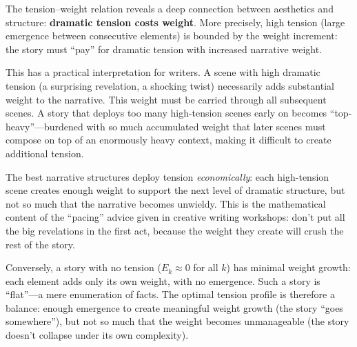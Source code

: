 \begin{remark}
\label{rem:tension-weight-intuition}
The tension--weight relation reveals a deep connection between aesthetics
and structure: \textbf{dramatic tension costs weight}.  More precisely,
high tension (large emergence between consecutive elements) is bounded by
the weight increment: the story must ``pay'' for dramatic tension with
increased narrative weight.

This has a practical interpretation for writers.  A scene with high dramatic
tension (a surprising revelation, a shocking twist) necessarily adds
substantial weight to the narrative.  This weight must be carried through
all subsequent scenes.  A story that deploys too many high-tension scenes
early on becomes ``top-heavy''---burdened with so much accumulated weight
that later scenes must compose on top of an enormously heavy context,
making it difficult to create additional tension.

The best narrative structures deploy tension \emph{economically}: each
high-tension scene creates enough weight to support the next level of
dramatic structure, but not so much that the narrative becomes unwieldy.
This is the mathematical content of the ``pacing'' advice given in creative
writing workshops: don't put all the big revelations in the first act,
because the weight they create will crush the rest of the story.

Conversely, a story with no tension ($E_k \approx 0$ for all $k$) has
minimal weight growth: each element adds only its own weight, with no
emergence.  Such a story is ``flat''---a mere enumeration of facts.  The
optimal tension profile is therefore a balance: enough emergence to create
meaningful weight growth (the story ``goes somewhere''), but not so much
that the weight becomes unmanageable (the story doesn't collapse under its
own complexity).
\end{remark}

